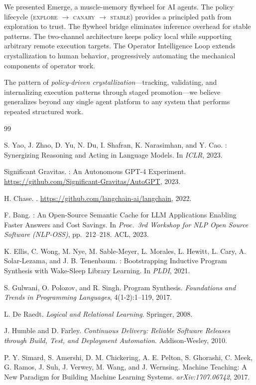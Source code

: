 \documentclass[11pt,a4paper]{article}
\begin{document}
We presented Emerge, a muscle-memory flywheel for AI agents.
The policy lifecycle (\textsc{explore} $\to$ \textsc{canary} $\to$ \textsc{stable}) provides a principled
path from exploration to trust.
The flywheel bridge eliminates inference overhead for stable patterns.
The two-channel architecture keeps policy local while supporting arbitrary remote execution targets.
The Operator Intelligence Loop extends crystallization to human behavior, progressively automating the
mechanical components of operator work.

The pattern of \emph{policy-driven crystallization}---tracking, validating, and internalizing execution
patterns through staged promotion---we believe generalizes beyond any single agent platform to any system
that performs repeated structured work.


\begin{thebibliography}{99}

S. Yao, J. Zhao, D. Yu, N. Du, I. Shafran, K. Narasimhan, and Y. Cao.
: Synergizing Reasoning and Acting in Language Models.
\newblock In \emph{ICLR}, 2023.

Significant Gravitas.
: An Autonomous {GPT-4} Experiment.
\newblock \url{https://github.com/Significant-Gravitas/AutoGPT}, 2023.

H. Chase.
.
\newblock \url{https://github.com/langchain-ai/langchain}, 2022.

F. Bang.
: An Open-Source Semantic Cache for {LLM} Applications Enabling Faster Answers and Cost Savings.
\newblock In \emph{Proc.\ 3rd Workshop for NLP Open Source Software (NLP-OSS)}, pp.\ 212--218. ACL, 2023.

K. Ellis, C. Wong, M. Nye, M. Sable-Meyer, L. Morales, L. Hewitt, L. Cary, A. Solar-Lezama, and J. B. Tenenbaum.
: Bootstrapping Inductive Program Synthesis with Wake-Sleep Library Learning.
\newblock In \emph{PLDI}, 2021.

S. Gulwani, O. Polozov, and R. Singh.
\newblock Program Synthesis.
\newblock \emph{Foundations and Trends in Programming Languages}, 4(1-2):1--119, 2017.

L. De Raedt.
\newblock \emph{Logical and Relational Learning}.
\newblock Springer, 2008.

J. Humble and D. Farley.
\newblock \emph{Continuous Delivery: Reliable Software Releases through Build, Test, and Deployment Automation}.
\newblock Addison-Wesley, 2010.

P. Y. Simard, S. Amershi, D. M. Chickering, A. E. Pelton, S. Ghorashi, C. Meek, G. Ramos, J. Suh,
J. Verwey, M. Wang, and J. Wernsing.
\newblock Machine Teaching: A New Paradigm for Building Machine Learning Systems.
\newblock \emph{arXiv:1707.06742}, 2017.

\end{thebibliography}
\end{document}
